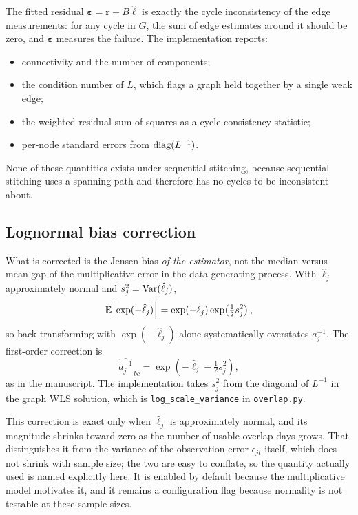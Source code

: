 \documentclass[12pt,a4paper,oneside]{article}
\begin{document}
The fitted residual $\bm{\varepsilon}=\bm{r}-B\hat{\bm{\ell}}$ is exactly the
cycle inconsistency of the edge measurements: for any cycle in $G$, the sum of
edge estimates around it should be zero, and $\bm{\varepsilon}$ measures the
failure. The implementation reports:
\begin{itemize}
\item connectivity and the number of components;
\item the condition number of $L$, which flags a graph held together by a
single weak edge;
\item the weighted residual sum of squares as a cycle-consistency statistic;
\item per-node standard errors from $\operatorname{diag}(L^{-1})$.
\end{itemize}
None of these quantities exists under sequential stitching, because sequential
stitching uses a spanning path and therefore has no cycles to be inconsistent
about.

\subsection{Lognormal bias correction}

What is corrected is the Jensen bias \emph{of the estimator}, not the
median-versus-mean gap of the multiplicative error in the data-generating
process. With $\hat{\ell}_j$ approximately normal and
$s_j^2=\operatorname{Var}(\hat{\ell}_j)$,
\begin{equation}
\mathbb{E}\!\left[\exp(-\hat{\ell}_j)\right]
=\exp(-\ell_j)\exp\!\left(\tfrac{1}{2}s_j^2\right),
\end{equation}
so back-transforming with $\exp(-\hat{\ell}_j)$ alone systematically overstates
$a_j^{-1}$. The first-order correction is
\begin{equation}
\widehat{a_j^{-1}}_{\,bc}=\exp\!\left(-\hat{\ell}_j-\tfrac{1}{2}s_j^2\right),
\end{equation}
as in the manuscript. The implementation takes $s_j^2$ from the diagonal of
$L^{-1}$ in the graph WLS solution, which is \texttt{log\_scale\_variance} in
\texttt{overlap.py}.

\begin{remark}[Departure 2]
This correction is exact only when $\hat{\ell}_j$ is approximately normal, and
its magnitude shrinks toward zero as the number of usable overlap days grows.
That distinguishes it from the variance of the observation error
$\epsilon_{jt}$ itself, which does not shrink with sample size; the two are easy
to conflate, so the quantity actually used is named explicitly here. It is
enabled by default because the multiplicative model motivates it, and it remains
a configuration flag because normality is not testable at these sample sizes.
\end{remark}
\end{document}
